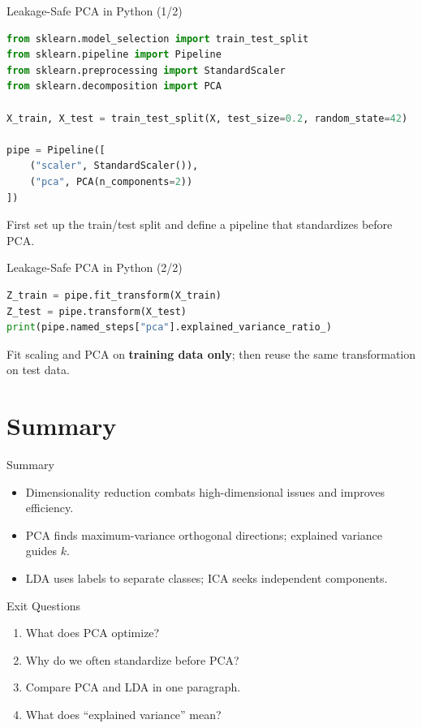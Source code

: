 \documentclass[aspectratio=169]{beamer}
\begin{document}
\begin{frame}[fragile]{Leakage-Safe PCA in Python (1/2)}
  \begin{lstlisting}[language=Python]
from sklearn.model_selection import train_test_split
from sklearn.pipeline import Pipeline
from sklearn.preprocessing import StandardScaler
from sklearn.decomposition import PCA

X_train, X_test = train_test_split(X, test_size=0.2, random_state=42)

pipe = Pipeline([
    ("scaler", StandardScaler()),
    ("pca", PCA(n_components=2))
])
  \end{lstlisting}
  \small First set up the train/test split and define a pipeline that standardizes before PCA.
\end{frame}

\begin{frame}[fragile]{Leakage-Safe PCA in Python (2/2)}
  \begin{lstlisting}[language=Python]
Z_train = pipe.fit_transform(X_train)
Z_test = pipe.transform(X_test)
print(pipe.named_steps["pca"].explained_variance_ratio_)
  \end{lstlisting}
  \small Fit scaling and PCA on \textbf{training data only}; then reuse the same transformation on test data.
\end{frame}

\section{Summary}
\label{sec:summary}

\begin{frame}{Summary}
  \begin{itemize}
    \item Dimensionality reduction combats high-dimensional issues and improves efficiency.
    \item PCA finds maximum-variance orthogonal directions; explained variance guides $k$.
    \item LDA uses labels to separate classes; ICA seeks independent components.
  \end{itemize}
  \slidesources{\AIMLUnitIIISources}
\end{frame}

\begin{frame}{Exit Questions}
  \begin{enumerate}
    \item What does PCA optimize?
    \item Why do we often standardize before PCA?
    \item Compare PCA and LDA in one paragraph.
    \item What does ``explained variance'' mean?
  \end{enumerate}
\end{frame}
\end{document}
